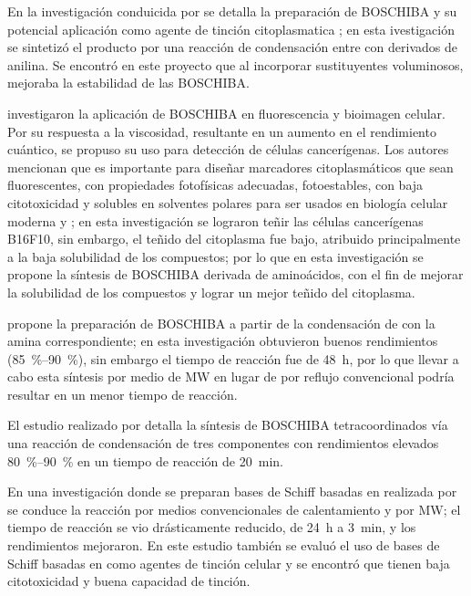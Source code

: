 \documentclass[12pt,spanish]{scrartcl}
\begin{document}
En la investigación conduicida por \textcite{corona-lopezSynthesisCharacterizationPhotophysical2017} se detalla la preparación de \gls{BOSCHIBA} y su potencial aplicación como agente de tinción citoplasmatica \invitro{}; en esta ivestigación se sintetizó el producto por una reacción de condensación entre  con derivados de anilina. Se encontró en este proyecto que al incorporar sustituyentes voluminosos, mejoraba la estabilidad de las \gls{BOSCHIBA}.

\textcite{ibarra-rodriguezOrganoboronSchiffBases2019} investigaron la aplicación de \gls{BOSCHIBA} en fluorescencia y bioimagen celular. Por su respuesta a la viscosidad, resultante en un aumento en el rendimiento cuántico, se propuso su uso para detección de células cancerígenas. Los autores mencionan que es importante para diseñar marcadores citoplasmáticos que sean fluorescentes, con propiedades fotofísicas adecuadas, fotoestables, con baja citotoxicidad y solubles en solventes polares para ser usados en biología celular moderna \invitro{} y \invivo{}; en esta investigación se lograron teñir las células cancerígenas B16F10, sin embargo, el teñido del citoplasma fue bajo, atribuido principalmente a la baja solubilidad de los compuestos; por lo que en esta investigación se propone la síntesis de \gls{BOSCHIBA} derivada de aminoácidos, con el fin de mejorar la solubilidad de los compuestos y lograr un mejor teñido del citoplasma.

\textcite{corona-lopezFarRedInfrared2021} propone la preparación de \gls{BOSCHIBA} a partir de la condensación de  con la amina correspondiente; en esta investigación obtuvieron buenos rendimientos  (\qtyrange{85}{90}{\percent}), sin embargo el tiempo de reacción fue de \qty{48}{\hour}, por lo que llevar a cabo esta síntesis por medio de \gls{MW} en lugar de por reflujo convencional podría resultar en un menor tiempo de reacción.

El estudio realizado por \textcite{garcia-lopezNewLuminescentOrganoboron2022} detalla la síntesis de \gls{BOSCHIBA} tetracoordinados vía una reacción de condensación de tres componentes con rendimientos elevados \qtyrange{80}{90}{\percent} en un tiempo de reacción de \qty{20}{\minute}.

En una investigación donde se preparan bases de Schiff basadas en  realizada por \textcite{lopez-espejelOrganotinSchiffBases2021} se conduce la reacción por medios convencionales de calentamiento y por \gls{MW}; el tiempo de reacción se vio drásticamente reducido, de \qty{24}{\hour} a \qty{3}{\minute}, y los rendimientos mejoraron. En este estudio también se evaluó el uso de bases de Schiff basadas en  como agentes de tinción celular y se encontró que tienen baja citotoxicidad y buena capacidad de tinción.
\end{document}
